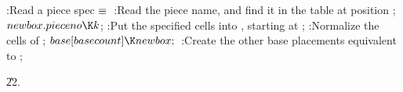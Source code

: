 \B{}:Read a piece spec\X${}\equiv{}$\6
:Read the piece name, and find it in the  table at position %
\X;\6
${}\\{newbox}.\\{pieceno}\K\|k{}$;\6
:Put the specified cells into , starting at \X;\6
:Normalize the cells of \X;\6
${}\\{base}[\\{basecount}]\K\\{newbox};{}$\6
:Create the other base placements equivalent to \X;\par
\U22.\fi

